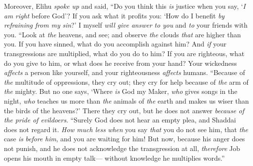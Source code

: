 \begin{biblechapter} %
 Moreover, Elihu \textit{spoke up} and said,
\verse “Do you think this \textit{is} justice when you say, 
‘\textit{I am right} before God’?
\verse If you ask what it profits you: 
‘How do I benefit \textit{by refraining from my sin}?’
\verse I myself \textit{will give answer to you} 
and \textit{to} your friends with you.
\verse “Look at \textit{the} heavens, and see; 
and observe \textit{the} clouds \textit{that} are higher than you.
\verse If you have sinned, what do you accomplish against him? 
And \textit{if} your transgressions are multiplied, what do you do to him?
\verse If you are righteous, what do you give to him, 
or what does he receive from your hand?
\verse Your wickedness \textit{affects} a person like yourself, 
and your righteousness \textit{affects} humans.
\verse “Because of \textit{the} multitude of oppressions, they cry out; 
they cry for help because of \textit{the} arm of \textit{the} mighty.
\verse But no one says, ‘Where \textit{is} God my Maker, 
\textit{who} gives songs in the night,
\verse \textit{who} teaches us more than \textit{the} animals of \textit{the} earth 
and makes us wiser than the birds of the heavens?’
\verse There they cry out, but he does not answer 
\textit{because of the pride of evildoers}.
\verse “Surely God does not hear an empty plea, 
and Shaddai does not regard it.
\verse \textit{How much less} \textit{when} you say \textit{that} you do not see him, 
that \textit{the} case \textit{is} \textit{before him}, and you are waiting for him!
\verse But now, because his anger does not punish, 
and he does not acknowledge the transgression at all,
\verse \textit{therefore} Job opens his mouth in empty talk— 
without knowledge he multiplies words.”
\end{biblechapter}

